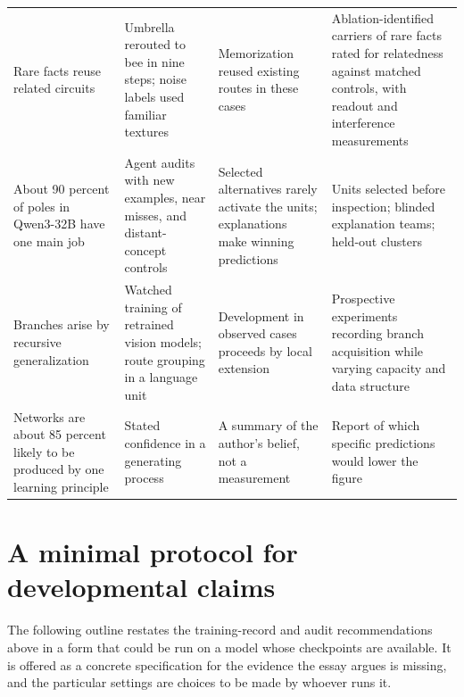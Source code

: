 \documentclass[11pt]{article}
\begin{document}
{\begin{longtable}{@{}p{}p{}p{}p{}@{}}
\addlinespace
Rare facts reuse related circuits & Umbrella rerouted to bee in nine steps; noise labels used familiar textures & Memorization reused existing routes in these cases & Ablation-identified carriers of rare facts rated for relatedness against matched controls, with readout and interference measurements\\
\addlinespace
About 90 percent of poles in Qwen3-32B have one main job & Agent audits with new examples, near misses, and distant-concept controls & Selected alternatives rarely activate the units; explanations make winning predictions & Units selected before inspection; blinded explanation teams; held-out clusters\\
\addlinespace
Branches arise by recursive generalization & Watched training of retrained vision models; route grouping in a language unit & Development in observed cases proceeds by local extension & Prospective experiments recording branch acquisition while varying capacity and data structure\\
\addlinespace
Networks are about 85 percent likely to be produced by one learning principle & Stated confidence in a generating process & A summary of the author's belief, not a measurement & Report of which specific predictions would lower the figure\\
\bottomrule
\end{longtable}
}

\section{A minimal protocol for developmental claims}

The following outline restates the training-record and audit recommendations above in a form that could be run on a model whose checkpoints are available. It is offered as a concrete specification for the evidence the essay argues is missing, and the particular settings are choices to be made by whoever runs it.
\end{document}
